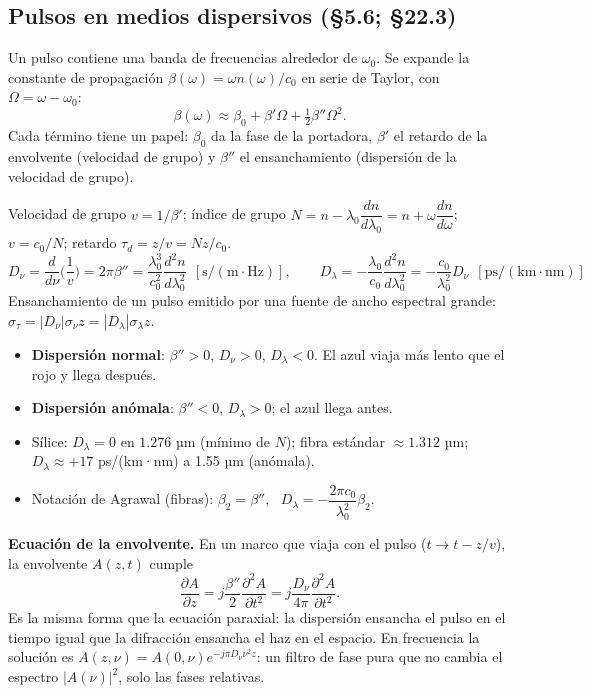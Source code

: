 \documentclass[10pt]{article}
\begin{document}
\subsection{Pulsos en medios dispersivos (§5.6; §22.3)}
Un pulso contiene una banda de frecuencias alrededor de $\omega_0$. Se expande la constante de propagación $\beta(\omega)=\omega n(\omega)/c_0$ en serie de Taylor, con $\Omega=\omega-\omega_0$:
\[
\beta(\omega)\approx\beta_0+\beta'\Omega+\tfrac12\beta''\Omega^2 .
\]
Cada término tiene un papel: $\beta_0$ da la fase de la portadora, $\beta'$ el retardo de la envolvente (velocidad de grupo) y $\beta''$ el ensanchamiento (dispersión de la velocidad de grupo).

\begin{clave}[title={Velocidad de grupo y coeficientes de dispersión}]
Velocidad de grupo $v=1/\beta'$; índice de grupo $N=n-\lambda_0\dfrac{dn}{d\lambda_0}=n+\omega\dfrac{dn}{d\omega}$; \ $v=c_0/N$; retardo $\tau_d=z/v=Nz/c_0$.
\[
D_\nu=\frac{d}{d\nu}\Big(\frac1v\Big)=2\pi\beta''=\frac{\lambda_0^3}{c_0^2}\frac{d^2n}{d\lambda_0^2}\ \ [\mathrm{s/(m\cdot Hz)}],\qquad
D_\lambda=-\frac{\lambda_0}{c_0}\frac{d^2n}{d\lambda_0^2}=-\frac{c_0}{\lambda_0^2}D_\nu\ \ [\mathrm{ps/(km\cdot nm)}]
\]
Ensanchamiento de un pulso emitido por una fuente de ancho espectral grande: $\sigma_\tau=|D_\nu|\sigma_\nu z=|D_\lambda|\sigma_\lambda z$.
\end{clave}
\begin{itemize}
\item \textbf{Dispersión normal}: $\beta''>0$, $D_\nu>0$, $D_\lambda<0$. El azul viaja más lento que el rojo y llega después.
\item \textbf{Dispersión anómala}: $\beta''<0$, $D_\lambda>0$; el azul llega antes.
\item Sílice: $D_\lambda=0$ en $1.276$ µm (mínimo de $N$); fibra estándar $\approx1.312$ µm; $D_\lambda\approx+17$ ps/(km·nm) a 1.55 µm (anómala).
\item Notación de Agrawal (fibras): $\beta_2=\beta''$, \ $D_\lambda=-\dfrac{2\pi c_0}{\lambda_0^2}\beta_2$.
\end{itemize}

\textbf{Ecuación de la envolvente.} En un marco que viaja con el pulso ($t\to t-z/v$), la envolvente $A(z,t)$ cumple
\[
\frac{\partial A}{\partial z}=j\frac{\beta''}{2}\frac{\partial^2A}{\partial t^2}=j\frac{D_\nu}{4\pi}\frac{\partial^2A}{\partial t^2}.
\]
Es la misma forma que la ecuación paraxial: la dispersión ensancha el pulso en el tiempo igual que la difracción ensancha el haz en el espacio. En frecuencia la solución es $A(z,\nu)=A(0,\nu)e^{-j\pi D_\nu\nu^2z}$: un filtro de fase pura que no cambia el espectro $|A(\nu)|^2$, solo las fases relativas.
\end{document}
